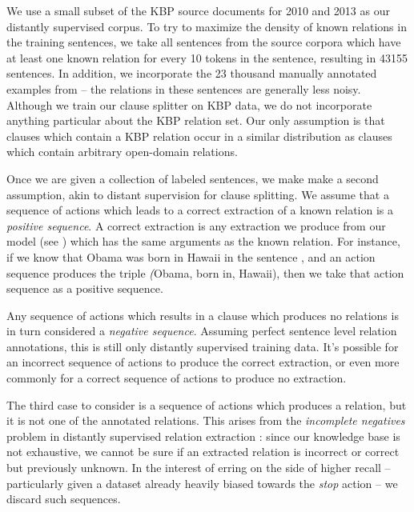 We use a small subset of the KBP source documents for 
  2010 \cite{key:2010ji-kbpoverview}
  and 2013 \cite{key:2013surdeanu-kbpoverview}
  as our distantly supervised corpus.
To try to maximize the density of known relations in the training sentences,
  we take all sentences from the source corpora which have at least one known
  relation for every 10 tokens in the sentence,
  resulting in \num{43155} sentences.
In addition, we incorporate the 23 thousand manually annotated examples
  from  -- the relations in these sentences
  are generally less noisy.
Although we train our clause splitter on KBP data, we do not incorporate
  anything particular about the KBP relation set.
Our only assumption is that clauses which contain a KBP relation occur in
  a similar distribution as clauses which contain arbitrary open-domain
  relations.

Once we are given a collection of labeled sentences, we make make a second
  assumption, akin to distant supervision for clause splitting.
We assume that a sequence of actions which leads to a correct extraction of
  a known relation is a \textit{positive sequence}.
A correct extraction is any extraction we produce from our model
  (see ) which has the same arguments as the known
  relation.
For instance, if we know that Obama was born in Hawaii in the sentence
  , and an action sequence produces the triple
  \textit(Obama, born in, Hawaii), then we take that action sequence as
  a positive sequence.

Any sequence of actions which results in a clause which produces no relations
  is in turn considered a \textit{negative sequence}.
Assuming perfect sentence level relation annotations, this is still only
  distantly supervised training data.
It's possible for an incorrect sequence of actions to produce the correct
  extraction, or even more commonly for a correct sequence of actions to 
  produce no extraction.

The third case to consider is a sequence of actions which produces a relation,
  but it is not one of the annotated relations.
This arises from the \textit{incomplete negatives} problem in distantly
  supervised relation extraction \cite{key:2013min-incomplete}: 
  since our knowledge base is not exhaustive,
  we cannot be sure if an extracted relation is incorrect or correct but
  previously unknown.
In the interest of erring on the side of higher recall -- particularly given
  a dataset already heavily biased towards the \textit{stop} action --
  we discard such sequences.

